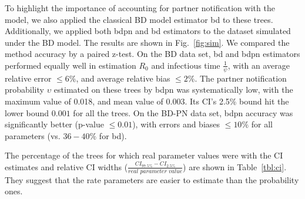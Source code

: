 \documentclass[10pt,letterpaper]{article}
\begin{document}
To highlight the importance of accounting for partner notification with the model, we also applied the classical BD model estimator bd to these trees. Additionally, we applied both bdpn and bd estimators to the dataset simulated under the BD model. The results are shown in  Fig.~\ref{fig:sim}.
We compared the method accuracy by a paired z-test. On the BD data set, bd and bdpn estimators performed equally well in estimation $R_0$ and infectious time $\frac{1}{\psi}$, with an average relative error $\leq 6\%$, and average relative bias $\leq 2\%$. The partner notification probability $\upsilon$ estimated on these trees by bdpn was systematically low, with the maximum value of 0.018, and mean value of 0.003. Its CI's 2.5\% bound hit the lower bound $0.001$ for all the trees. On the BD-PN data set, bdpn accuracy was significantly better (p-value $\leq 0.01$), with errors and biases $\leq 10\%$ for all parameters (vs. $36-40\%$ for bd).






The percentage of the trees for which real parameter values were with the CI estimates and relative CI widths ($\frac{CI_{97.5\%} - CI_{2.5\%}}{\textit{real parameter value}}$) are shown in Table~\ref{tbl:ci}. They suggest that the rate parameters are easier to estimate than the probability ones.
\end{document}

